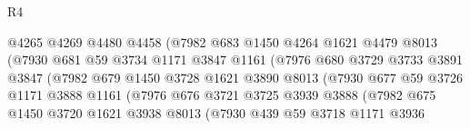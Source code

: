 \begin{lexlean}{R4}
\begin{coremodule}
                                @4265
                                @4269
                                @4480
                                @4458
                                (@7982
                                  @683
                                  @1450
                                  @4264
                                  @1621
                                  @4479
                                  @8013
                                  (@7930
                                    @681
                                    @59
                                    @3734
                                    @1171
                                    @3847
                                    @1161
                                    (@7976
                                      @680
                                      @3729
                                      @3733
                                      @3891
                                      @3847
                                      (@7982
                                        @679
                                        @1450
                                        @3728
                                        @1621
                                        @3890
                                        @8013
                                        (@7930
                                          @677
                                          @59
                                          @3726
                                          @1171
                                          @3888
                                          @1161
                                          (@7976
                                            @676
                                            @3721
                                            @3725
                                            @3939
                                            @3888
                                            (@7982
                                              @675
                                              @1450
                                              @3720
                                              @1621
                                              @3938
                                              @8013
                                              (@7930
                                                @439
                                                @59
                                                @3718
                                                @1171
                                                @3936

\end{coremodule}
\end{lexlean}
